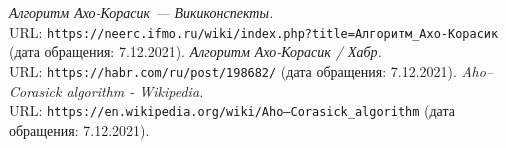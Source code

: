 \begin{thebibliography}{99}
{\itshape Алгоритм Ахо-Корасик — Викиконспекты.} \\URL: \texttt{https://neerc.ifmo.ru/wiki/index.php?title=Алгоритм\_Ахо-Корасик} (дата обращения: 7.12.2021).
{\itshape Алгоритм Ахо-Корасик / Хабр.} \\URL: \texttt{https://habr.com/ru/post/198682/} (дата обращения: 7.12.2021).
{\itshape Aho–Corasick algorithm - Wikipedia.} \\URL: \texttt{https://en.wikipedia.org/wiki/Aho--Corasick\_algorithm} (дата обращения: 7.12.2021).
\end{thebibliography}
\pagebreak
